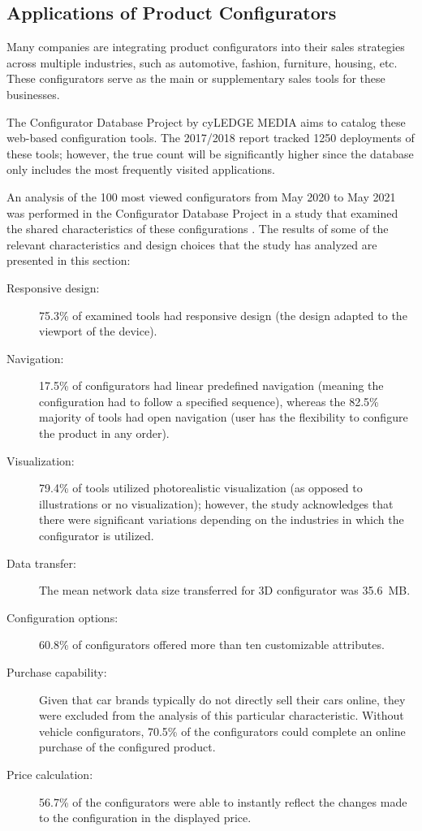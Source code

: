 \subsection{Applications of Product Configurators}

Many companies are integrating product configurators into their sales strategies across multiple industries, such as automotive, fashion, furniture, housing, etc. These configurators serve as the main or supplementary sales tools for these businesses.

The Configurator Database Project by cyLEDGE MEDIA aims to catalog these web-based configuration tools. The 2017/2018 report tracked 1250 deployments of these tools; however, the true count will be significantly higher since the database only includes the most frequently visited applications. \cite{cyLEDGE2018}

An analysis of the 100 most viewed configurators  from May 2020 to May 2021 was performed in the Configurator Database Project in a study that examined the shared characteristics of these configurations \cite{Blazek2023}. The results of some of the relevant characteristics and design choices that the study has analyzed are presented in this section:
\begin{description}
    \item[Responsive design:] 75.3\% of examined tools had responsive design (the design adapted to the viewport of the device).
    \item[Navigation:] 17.5\% of configurators had linear predefined navigation (meaning the configuration had to follow a specified sequence), whereas the 82.5\% majority of tools had open navigation (user has the flexibility to configure the product in any order).
    \item[Visualization:] 79.4\% of tools utilized photorealistic visualization (as opposed to illustrations or no visualization); however, the study acknowledges that there were significant variations depending on the industries in which the configurator is utilized.
    \item[Data transfer:] The mean network data size transferred for 3D configurator was 35.6~MB.
    \item[Configuration options:] 60.8\% of configurators offered more than ten customizable attributes.
    \item[Purchase capability:] Given that car brands typically do not directly sell their cars online, they were excluded from the analysis of this particular characteristic. Without vehicle configurators, 70.5\% of the configurators could complete an online purchase of the configured product.
    \item[Price calculation:] 56.7\% of the configurators were able to instantly reflect the changes made to the configuration in the displayed price.
\end{description}

